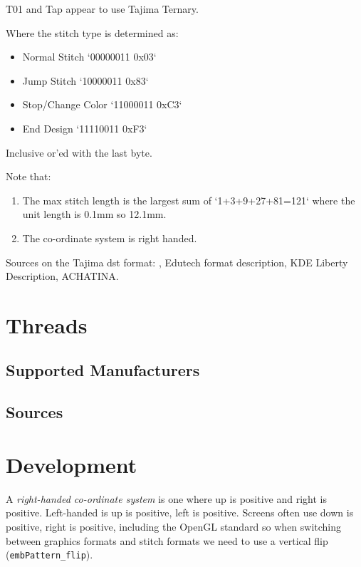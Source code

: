 \documentclass[onesize, a4paper]{refart}
\begin{document}
T01 and Tap appear to use Tajima Ternary.
 
Where the stitch type is determined as:

\begin{itemize}
\item Normal Stitch `00000011 0x03`
\item Jump Stitch `10000011 0x83`
\item Stop/Change Color `11000011 0xC3`
\item End Design `11110011 0xF3`
\end{itemize}

Inclusive or'ed with the last byte.

Note that:

\begin{enumerate}
\item The max stitch length is the largest sum of `1+3+9+27+81=121` where the unit length is 0.1mm so 12.1mm.
\item The co-ordinate system is right handed.
\end{enumerate}

Sources on the Tajima dst format: \cite{fineEmbStudio2021},
Edutech format description\cite{eduTechWikiDST},
KDE Liberty Description\cite{libertyTajima}, ACHATINA\cite{achatina}.

\section{Threads}

\subsection{Supported Manufacturers}

\subsection{Sources}

\section{Development}

A \emph{right-handed co-ordinate system} is one where up is positive and right is positive. Left-handed is up is positive, left is positive. Screens often use down is positive, right is positive, including the OpenGL standard so when switching between graphics formats and stitch formats we need to use a vertical flip (\texttt{embPattern\_flip}).
\end{document}
